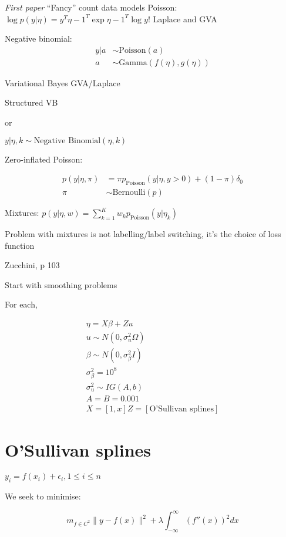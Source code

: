 \documentclass{amsart}
\begin{document}
\emph{First paper} ``Fancy'' count data models
Poisson: $\log p(y|\eta) = y^T \eta - 1^T \exp{\eta} - 1^T \log{y!}$
Laplace and GVA

Negative binomial:
\begin{align*}
	y|a &\sim \text{Poisson}(a)\\
	a &\sim \text{Gamma}(f(\eta), g(\eta))
\end{align*}

Variational Bayes
GVA/Laplace

Structured VB

or

$y|\eta, k \sim \text{Negative Binomial}(\eta, k)$

Zero-inflated Poisson: 

\begin{align*}
	p(y|\eta, \pi)&= \pi p_{\text{Poisson}}(y|\eta, y>0) + (1-\pi)\delta_0 \\
	\pi & \sim \text{Bernoulli}(p)
\end{align*}

Mixtures: $p(y|\eta, w) = \sum_{k=1}^K w_k p_{\text{Poisson}} (y|\eta_k)$

Problem with mixtures is not labelling/label switching, it's the choice of loss
function

Zucchini, p 103

Start with smoothing problems

For each,

\begin{align*}
	\eta = X\beta + Zu\\
	u \sim N(0, \sigma_u^2 \Omega) \\
	\beta \sim N(0, \sigma_\beta^2 I) \\
	\sigma_\beta^2 = 10^8 \\
	\sigma_u^2 \sim IG(A, b) \\
	A = B = 0.001 \\
	X = [1, x]
	Z = [\text{O'Sullivan splines}]
\end{align*}

\section{O'Sullivan splines}
$y_i = f(x_i) + \epsilon_i, 1 \leq i \leq n$

We seek to minimise:

\begin{equation*}
	m_{f \in C^2} \|y - f(x)\|^2 + \lambda \int_{-\infty}^{\infty} (f''(x))^2 dx
\end{equation*}
\end{document}
